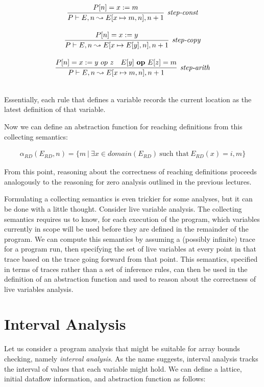\documentclass[11pt]{article}
\begin{document}
\begin{sloppypar}
\[\begin{array}{c}
\infer[\textit{step-const}]{P \vdash E,n \leadsto E[x \mapsto m,n],n+1}{P[n] = x := m}\\[3ex]

\infer[\textit{step-copy}]
	{P \vdash E,n \leadsto E[x \mapsto E[y],n],n+1}
	{P[n] = x := y}\\[3ex]
	
\infer[\textit{step-arith}]
	{P \vdash E,n \leadsto E[x \mapsto m,n],n+1}
	{P[n] = x := y ~op~ z & E[y] ~\mathbf{op}~ E[z] = m}\\[3ex]
	
\end{array}
\]

Essentially, each rule that defines a variable records the current location as the latest definition of that variable.

Now we can define an abstraction function for reaching definitions from this collecting semantics:

\[
\begin{array}{c}
\alpha_{RD}(E_{RD},n) = \{m ~|~ \exists x \in domain(E_{RD}) ~\mbox{such that}~ E_{RD}(x)=i,m\}
\end{array}
\]

From this point, reasoning about the correctness of reaching definitions proceeds analogously to the reasoning for zero analysis outlined in the previous lectures.

Formulating a collecting semantics is even trickier for some analyses, but it can be done with a little thought.  Consider live variable analysis.  The collecting semantics requires us to know, for each execution of the program, which variables currently in scope will be used before they are defined in the remainder of the program.  We can compute this semantics by assuming a (possibly infinite) trace for a program run, then specifying the set of live variables at every point in that trace based on the trace going forward from that point.  This semantics, specified in terms of traces rather than a set of inference rules, can then be used in the definition of an abstraction function and used to reason about the correctness of live variables analysis.


\section{Interval Analysis}

Let us consider a program analysis that might be suitable for array bounds checking, namely \textit{interval analysis}.  As the name suggests, interval analysis tracks the interval of values that each variable might hold.  We can define a lattice, initial dataflow information, and abstraction function as follows:


\end{sloppypar}
\end{document}
